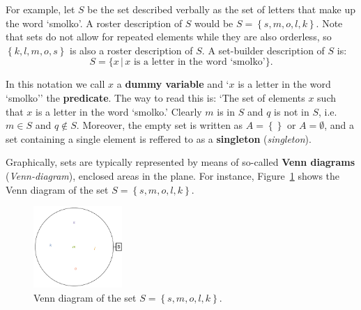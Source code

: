 For example, let $S$ be the set described verbally as the set of letters that make up the word `smolko'.  A  roster description of $S$ would be  $S=\left\{ s, m, o, l, k \right\}$. Note that sets do not allow for repeated elements while they are also  orderless, so $\left\{ k,  l,  m, o, s \right\}$ is also a roster description of $S$. A set-builder description of $S$ is: 
\[ S=\{ x \, | \, \mbox{$x$ is a letter in the word `smolko'}\}. \]

In this notation we call $x$ a \textbf{dummy variable} and `$x$ is a letter in the word `smolko'' the \textbf{predicate}. The way to read this is: `The set of elements $x$ such that $x$ is a letter in the word `smolko.'
Clearly $m$ is in $S$ and $q$ is not in $S$, i.e.\   $m \in S$ and $q \notin S$.  Moreover, the empty set is written as $A=\left\{\right\}$ or $A=\emptyset$, and a set containing a single element is reffered to as a \textbf{singleton} (\textit{singleton}).

Graphically, sets are typically represented by means of so-called \textbf{Venn diagrams} (\textit{Venn-diagram}), enclosed areas in the plane. For instance, Figure~\ref{fig_sets_1} shows the Venn diagram of the set $S=\left\{ s, m, o, l, k \right\}$. 


\begin{figure}[h!]
	\begin{center}
		\includegraphics[width=0.3\textwidth]{fig_sets_1}
		\caption{Venn diagram of the set $S=\left\{ s, m, o, l, k \right\}$.}
		\label{fig_sets_1}
	\end{center}
\end{figure}

